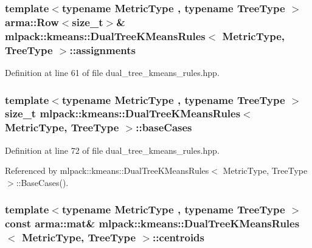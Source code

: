 \subsubsection[{assignments}]{\setlength{\rightskip}{0pt plus 5cm}template$<$typename Metric\+Type , typename Tree\+Type $>$ arma\+::\+Row$<$size\+\_\+t$>$\& {\bf mlpack\+::kmeans\+::\+Dual\+Tree\+K\+Means\+Rules}$<$ Metric\+Type, Tree\+Type $>$\+::assignments\hspace{0.3cm}{\ttfamily [private]}}\label{classmlpack_1_1kmeans_1_1DualTreeKMeansRules_a3ec40fc02a0a9cff429cb1cdf613497d}


Definition at line 61 of file dual\+\_\+tree\+\_\+kmeans\+\_\+rules.\+hpp.

\subsubsection[{base\+Cases}]{\setlength{\rightskip}{0pt plus 5cm}template$<$typename Metric\+Type , typename Tree\+Type $>$ size\+\_\+t {\bf mlpack\+::kmeans\+::\+Dual\+Tree\+K\+Means\+Rules}$<$ Metric\+Type, Tree\+Type $>$\+::base\+Cases\hspace{0.3cm}{\ttfamily [private]}}\label{classmlpack_1_1kmeans_1_1DualTreeKMeansRules_a08ad4f19e8807d236eadff33657cd236}


Definition at line 72 of file dual\+\_\+tree\+\_\+kmeans\+\_\+rules.\+hpp.



Referenced by mlpack\+::kmeans\+::\+Dual\+Tree\+K\+Means\+Rules$<$ Metric\+Type, Tree\+Type $>$\+::\+Base\+Cases().

\subsubsection[{centroids}]{\setlength{\rightskip}{0pt plus 5cm}template$<$typename Metric\+Type , typename Tree\+Type $>$ const arma\+::mat\& {\bf mlpack\+::kmeans\+::\+Dual\+Tree\+K\+Means\+Rules}$<$ Metric\+Type, Tree\+Type $>$\+::centroids\hspace{0.3cm}{\ttfamily [private]}}\label{classmlpack_1_1kmeans_1_1DualTreeKMeansRules_a062b3ecb04d5cd393eb186450c6c3da5}


